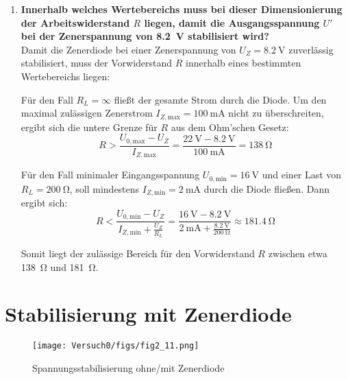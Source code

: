 \documentclass{article}
\begin{document}
\begin{enumerate}[label=\textbf{(\Alph*)}]
    \item \textbf{Innerhalb welches Wertebereichs muss bei dieser Dimensionierung der Arbeitswiderstand $R$ liegen, damit die Ausgangsspannung $U'$ bei der Zenerspannung von \SI{8.2}{\volt} stabilisiert wird?}
   \\ Damit die Zenerdiode bei einer Zenerspannung von \( U_Z = \SI{8.2}{\volt} \) zuverlässig stabilisiert, muss der Vorwiderstand \( R \) innerhalb eines bestimmten Wertebereichs liegen:

Für den Fall \( R_L = \infty \) fließt der gesamte Strom durch die Diode. Um den maximal zulässigen Zenerstrom \( I_{Z,\text{max}} = \SI{100}{\milli\ampere} \) nicht zu überschreiten, ergibt sich die untere Grenze für \( R \) aus dem Ohm’schen Gesetz:
\[
R > \frac{U_{0,\text{max}} - U_Z}{I_{Z,\text{max}}} = \frac{\SI{22}{\volt} - \SI{8.2}{\volt}}{\SI{100}{\milli\ampere}} = \SI{138}{\ohm}
\]

Für den Fall minimaler Eingangsspannung \( U_{0,\text{min}} = \SI{16}{\volt} \) und einer Last von \( R_L = \SI{200}{\ohm} \), soll mindestens \( I_{Z,\text{min}} = \SI{2}{\milli\ampere} \) durch die Diode fließen. Dann ergibt sich:
\[
R < \frac{U_{0,\text{min}} - U_Z}{I_{Z,\text{min}} + \frac{U_Z}{R_L}} = \frac{\SI{16}{\volt} - \SI{8.2}{\volt}}{\SI{2}{\milli\ampere} + \frac{\SI{8.2}{\volt}}{\SI{200}{\ohm}}} \approx \SI{181.4}{\ohm}
\]

Somit liegt der zulässige Bereich für den Vorwiderstand \( R \) zwischen etwa \SI{138}{\ohm} und \SI{181}{\ohm}.

\end{enumerate}



\section{Stabilisierung mit Zenerdiode}

\begin{figure}[H]
             \centering
             \texttt{[image: Versuch0/figs/fig2\_11.png]}
             \caption{Spannungsstabilisierung ohne/mit Zenerdiode \cite{anleitung}}
             \label{fig:Zenerdiode}
         \end{figure}
\end{document}
